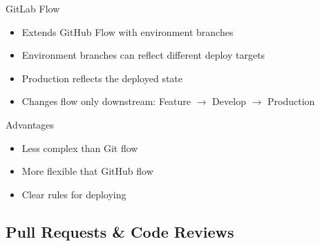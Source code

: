 \begin{frame}{\insertsubsection{} }
	\begin{fancycolumns}[animation=none]
		\begin{definition}{GitLab Flow}
			\begin{itemize}
				\item Extends GitHub Flow with environment branches
				\item Environment branches can reflect different deploy targets
				\item Production reflects the deployed state
				\item Changes flow only downstream: Feature $\rightarrow$ Develop $\rightarrow$ Production
			\end{itemize}
		\end{definition}\pause
		\begin{note}{Advantages}
			\begin{itemize}
				\item Less complex than Git flow
				\item More flexible that GitHub flow
				\item Clear rules for deploying
			\end{itemize}
		\end{note}
		\nextcolumn
	\end{fancycolumns}
\end{frame}

\subsection{Pull Requests \& Code Reviews}

